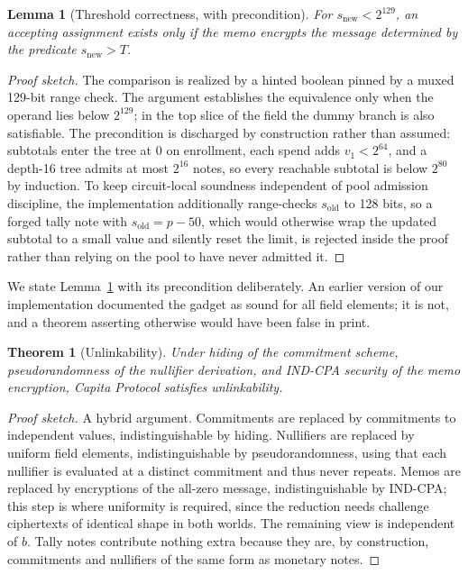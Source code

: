 \documentclass[11pt,a4paper]{article}
\theoremstyle{definition}
\theoremstyle{plain}
\newtheorem{theorem}{Theorem}
\newtheorem{lemma}{Lemma}
\theoremstyle{remark}
\begin{document}
\begin{lemma}[Threshold correctness, with precondition]
\label{lem:threshold}
For $s_{\mathrm{new}} < 2^{129}$, an accepting assignment exists only if the memo encrypts the message determined by the predicate $s_{\mathrm{new}} > T$.
\end{lemma}
\begin{proof}[Proof sketch]
The comparison is realized by a hinted boolean pinned by a muxed 129-bit range check. The argument establishes the equivalence only when the operand lies below $2^{129}$; in the top slice of the field the dummy branch is also satisfiable. The precondition is discharged by construction rather than assumed: subtotals enter the tree at $0$ on enrollment, each spend adds $v_1 < 2^{64}$, and a depth-16 tree admits at most $2^{16}$ notes, so every reachable subtotal is below $2^{80}$ by induction. To keep circuit-local soundness independent of pool admission discipline, the implementation additionally range-checks $s_{\mathrm{old}}$ to 128 bits, so a forged tally note with $s_{\mathrm{old}} = p - 50$, which would otherwise wrap the updated subtotal to a small value and silently reset the limit, is rejected inside the proof rather than relying on the pool to have never admitted it.
\end{proof}

We state Lemma~\ref{lem:threshold} with its precondition deliberately. An earlier version of our implementation documented the gadget as sound for all field elements; it is not, and a theorem asserting otherwise would have been false in print.

\begin{theorem}[Unlinkability]
Under hiding of the commitment scheme, pseudorandomness of the nullifier derivation, and IND-CPA security of the memo encryption, Capita Protocol satisfies unlinkability.
\end{theorem}
\begin{proof}[Proof sketch]
A hybrid argument. Commitments are replaced by commitments to independent values, indistinguishable by hiding. Nullifiers are replaced by uniform field elements, indistinguishable by pseudorandomness, using that each nullifier is evaluated at a distinct commitment and thus never repeats. Memos are replaced by encryptions of the all-zero message, indistinguishable by IND-CPA; this step is where uniformity is required, since the reduction needs challenge ciphertexts of identical shape in both worlds. The remaining view is independent of $b$. Tally notes contribute nothing extra because they are, by construction, commitments and nullifiers of the same form as monetary notes.
\end{proof}
\end{document}
